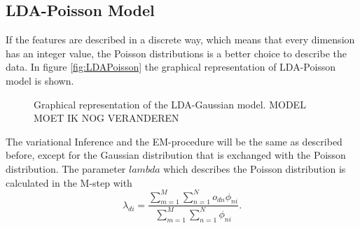 \documentclass[11pt,a4paper]{article}
\begin{document}
\subsection{LDA-Poisson Model}


If the features are described in a discrete way, which means that every dimension has an integer value, the Poisson distributions is a better choice to describe the data. In figure \ref{fig:LDAPoisson} the graphical representation of LDA-Poisson model is shown. 

\begin{figure}[h!]
\centering
\def\svgwidth{0.8\textwidth}

\caption{Graphical representation of the LDA-Gaussian model. MODEL MOET IK NOG VERANDEREN}
\label{fig:modelExt}
\end{figure}

The variational Inference and the EM-procedure will be the same as described before, except for the Gaussian distribution that is exchanged with the Poisson distribution. The parameter $lambda$ which describes the Poisson distribution is calculated in the M-step with
\begin{equation}
 \lambda_{di} = \frac{\sum_{m=1}^M \sum_{n=1}^N o_{dn} \phi_{ni} }{\sum_{m=1}^M \sum_{n=1}^N  \phi_{ni}}.
\end{equation}
\end{document}
